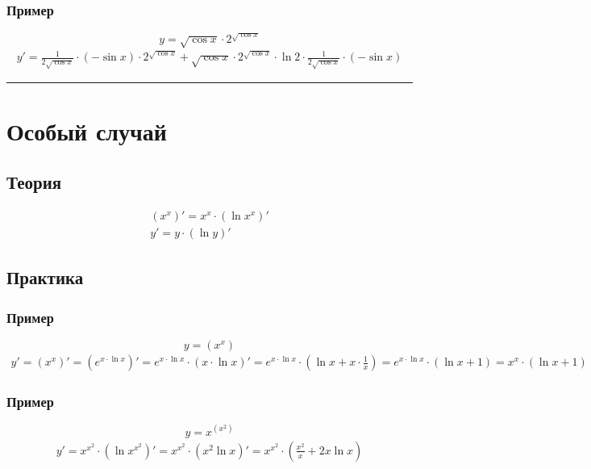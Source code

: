 \documentclass{article}
\begin{document}
\subsubsection{Пример}
\[
    y = \sqrt{\cos x} \cdot 2^{\sqrt{\cos x}}
\]
\begin{gather*}
    y' = \frac{1}{2\sqrt{\cos x}} \cdot (-\sin x) \cdot 2^{\sqrt{\cos x}} +
    \sqrt{\cos x} \cdot 2^{\sqrt{\cos x}} \cdot \ln 2 \cdot \frac{1}{2\sqrt{\cos x}} \cdot (-\sin x)
\end{gather*}



\par\noindent\rule{\textwidth}{1pt}
\section{Особый случай}

\subsection{Теория}
\begin{gather*}
    (x^x)' = x^x \cdot (\ln x^x)' \\
    y' = y \cdot (\ln y)'
\end{gather*}


\subsection{Практика}

\subsubsection{Пример}
\[
    y = \left( x^x \right)
\]
\begin{gather*}
    y' = \left( x^x \right)' = 
    \left( e^{x \cdot \ln x} \right)' =
    e^{x \cdot \ln x} \cdot \left( x \cdot \ln x \right)' =
    e^{x \cdot \ln x} \cdot \left( \ln x + x \cdot \frac{1}{x} \right) =
    e^{x \cdot \ln x} \cdot \left( \ln x + 1 \right) =
    x^x \cdot (\ln x + 1)
\end{gather*}

\subsubsection{Пример}
\[
    y = x^{(x^2)}
\]
\begin{gather*}
    y' = x^{x^2} \cdot \left( \ln x^{x^2} \right)' =
    x^{x^2} \cdot \left( x^2 \ln x \right)' =
    x^{x^2} \cdot \left( \frac{x^2}{x} + 2x \ln x \right)
\end{gather*}
\end{document}
